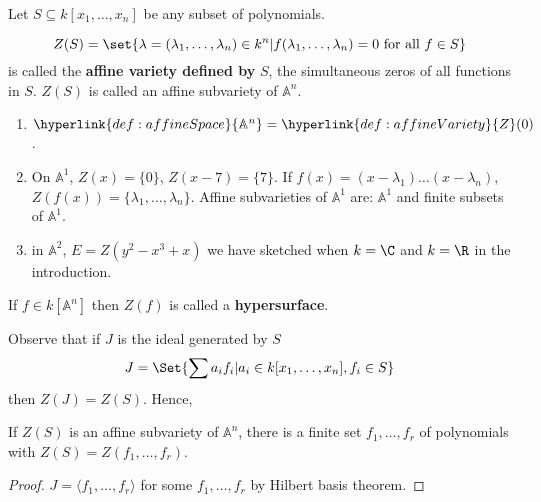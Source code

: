 \documentclass{article}
\newcommand{\A}{\mathbb{A}}
\begin{document}
Let $S \subseteq k[x_1, \dotsc, x_n]$ be any subset of polynomials.
\begin{defi}\label{def:affineVariety}
    \begin{equation*}
        Z(S) = \set{\lambda = (\lambda_1, \dotsc, \lambda_n) \in k^n | f(\lambda_1, \dotsc, \lambda_n) = 0 \text{ for all } f \in S}
    \end{equation*}
    is called the \textbf{affine variety defined by} $S$, the simultaneous zeros of all functions in $S$.
    $Z(S)$ is called an affine subvariety of $\A^n$.
\end{defi}

\begin{eg}
    \leavevmode
    \begin{enumerate}[label=(\roman*)]
        \item $\hyperlink{def:affineSpace}{\A^n} = \hyperlink{def:affineVariety}{Z}(0)$.
        \item On $\A^1$, $Z(x) = \{0\}$, $Z(x-7) = \{7\}$.  If $f(x) = (x - \lambda_1)\dotsc (x-\lambda_n)$, $Z(f(x)) = \{\lambda_1, \dotsc, \lambda_n\}$.
            Affine subvarieties of $\A^1$ are: $\A^1$ and finite subsets of $\A^1$.
        \item in $\A^2$, $E=Z(y^2-x^3+x)$ we have sketched when $k=\C$ and $k=\R$ in the introduction.
    \end{enumerate}
\end{eg}

\begin{remark}
    If $f \in k[\A^n]$ then $Z(f)$ is called a \textbf{hypersurface}.
\end{remark}

Observe that if $J$ is the ideal generated by $S$
\begin{equation*}
    J = \Set{\sum a_i f_i | a_i \in k[x_1, \dotsc, x_n], f_i \in S}
\end{equation*}
then $Z(J) = Z(S)$.  Hence,
\begin{thm}
    If $Z(S)$ is an affine subvariety of $\A^n$, there is a finite set $f_1, \dotsc, f_r$ of polynomials with $Z(S) = Z(f_1, \dotsc, f_r)$.
\end{thm}

\begin{proof}
    $J = \langle f_1, \dotsc, f_r \rangle$ for some $f_1, \dotsc, f_r$ by Hilbert basis theorem.
\end{proof}
\end{document}
